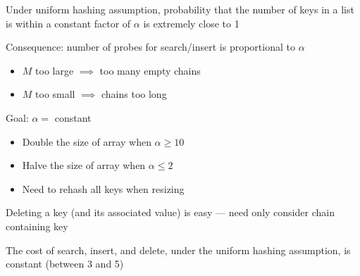 \documentclass[8pt,a4paper,compress]{beamer}
\begin{document}
\begin{frame}[fragile]
\pause

Under uniform hashing assumption, probability that the number of
keys in a list is within a constant factor of $\alpha$ is extremely close to 1

\pause
\bigskip

Consequence: number of probes for search/insert is proportional to $\alpha$
\begin{itemize}
\item $M$ too large $\implies$ too many empty chains

\item $M$ too small $\implies$ chains too long
\end{itemize}

\pause
\bigskip

Goal: $\alpha = $ constant
\begin{itemize}
\item Double the size of array when $\alpha \geq 10$

\item Halve the size of array when $\alpha \leq 2$

\item Need to rehash all keys when resizing
\end{itemize}

\pause
\bigskip

Deleting a key (and its associated value) is easy --- need only consider chain containing key

\pause
\bigskip

The cost of search, insert, and delete, under the uniform hashing assumption, is constant (between 3 and 5)
\end{frame}
\end{document}

